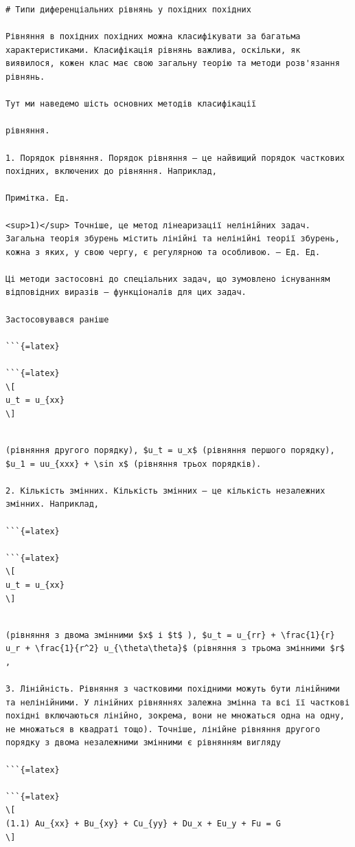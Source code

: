 \documentclass[
]{article}
\begin{document}
\begin{verbatim}
# Типи диференціальних рівнянь у похідних похідних

Рівняння в похідних похідних можна класифікувати за багатьма характеристиками. Класифікація рівнянь важлива, оскільки, як виявилося, кожен клас має свою загальну теорію та методи розв'язання рівнянь.

Тут ми наведемо шість основних методів класифікації

рівняння.

1. Порядок рівняння. Порядок рівняння — це найвищий порядок часткових похідних, включених до рівняння. Наприклад,

Примітка. Ед.

<sup>1)</sup> Точніше, це метод лінеаризації нелінійних задач. Загальна теорія збурень містить лінійні та нелінійні теорії збурень, кожна з яких, у свою чергу, є регулярною та особливою. — Ед. Ед.

Ці методи застосовні до спеціальних задач, що зумовлено існуванням відповідних виразів — функціоналів для цих задач.

Застосовувався раніше

```{=latex}

```{=latex}
\[
u_t = u_{xx}
\]
\end{verbatim}

\begin{verbatim}

(рівняння другого порядку), $u_t = u_x$ (рівняння першого порядку), $u_1 = uu_{xxx} + \sin x$ (рівняння трьох порядків).

2. Кількість змінних. Кількість змінних — це кількість незалежних змінних. Наприклад,

```{=latex}

```{=latex}
\[
u_t = u_{xx}
\]
\end{verbatim}

\begin{verbatim}

(рівняння з двома змінними $x$ і $t$ ), $u_t = u_{rr} + \frac{1}{r} u_r + \frac{1}{r^2} u_{\theta\theta}$ (рівняння з трьома змінними $r$ ,

3. Лінійність. Рівняння з частковими похідними можуть бути лінійними та нелінійними. У лінійних рівняннях залежна змінна та всі її часткові похідні включаються лінійно, зокрема, вони не множаться одна на одну, не множаться в квадраті тощо). Точніше, лінійне рівняння другого порядку з двома незалежними змінними є рівнянням вигляду

```{=latex}

```{=latex}
\[
(1.1) Au_{xx} + Bu_{xy} + Cu_{yy} + Du_x + Eu_y + Fu = G
\]
\end{verbatim}
\end{document}
